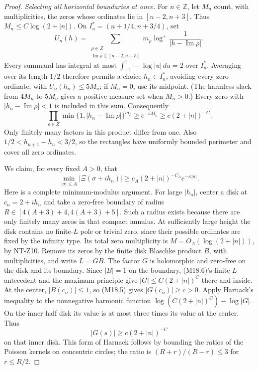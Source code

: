 \begin{proof}
\emph{Selecting all horizontal boundaries at once.}
For \(n\in\mathbb Z\), let \(M_n\) count, with multiplicities,
the zeros whose ordinates lie in \([n-2,n+3]\).  Thus
\(M_n\le C\log(2+|n|)\).  On
\(I_n^*=(n+1/4,n+3/4)\), set
\[
 U_n(h)=\sum_{\substack{\rho\in Z\\
                    \operatorname{Im}\rho\in[n-2,n+3]}}
       m_\rho\log^+\frac1{|h-\operatorname{Im}\rho|}.
\]
Every summand has integral at most
\(\int_{-1}^1-\log|u|\,du=2\) over \(I_n^*\).
Averaging over its length \(1/2\) therefore permits a
choice \(h_n\in I_n^*\), avoiding every zero ordinate,
with \(U_n(h_n)\le 5M_n\); if \(M_n=0\), use its midpoint.
(The harmless slack from \(4M_n\) to \(5M_n\) gives a
positive-measure set when \(M_n>0\).)
Every zero with \(|h_n-\operatorname{Im}\rho|<1\)
is included in this sum.  Consequently
\[
 \prod_{\rho\in Z}
   \min\{1,|h_n-\operatorname{Im}\rho|\}^{m_\rho}
      \ge e^{-5M_n}\ge c(2+|n|)^{-C}.                            \tag{M18.7}
\]
Only finitely many factors in this product differ from one.
Also \(1/2<h_{n+1}-h_n<3/2\), so the rectangles have
uniformly bounded perimeter and cover all zero ordinates.

We claim, for every fixed \(A>0\), that
\[
 \min_{|\sigma|\le A}|\Xi(\sigma+i h_n)|
       \ge c_A(2+|n|)^{-C_A}e^{-\kappa|n|}.                      \tag{M18.8}
\]
Here is a complete minimum-modulus argument.  For large
\(|h_n|\), center a disk at \(c_n=2+i h_n\) and take a
zero-free boundary of radius
\(R\in[4(A+3)+4,4(A+3)+5]\).  Such a radius exists because
there are only finitely many zeros in that compact annulus.
At sufficiently large height the disk contains no finite-\(L\)
pole or trivial zero, since their possible ordinates are fixed
by the infinity type.  Its total zero multiplicity is
\(M=O_A(\log(2+|n|))\), by NT-Z10.  Remove its zeros by the
finite disk Blaschke product \(B\), with multiplicities,
and write \(L=GB\).  The factor \(G\) is holomorphic and
zero-free on the disk and its boundary.  Since \(|B|=1\)
on the boundary, (M18.6)'s finite-\(L\) antecedent and the
maximum principle give \(|G|\le C(2+|n|)^C\) there and
inside.  At the center, \(|B(c_n)|\le1\), so (M18.5)
gives \(|G(c_n)|\ge c>0\).
Apply Harnack's inequality to the nonnegative harmonic
function \(\log(C(2+|n|)^C)-\log|G|\).  On the inner
half disk its value is at most three times its value
at the center.  Thus
\[
                        |G(s)|\ge c(2+|n|)^{-C}
\]
on that inner disk.  This form of Harnack follows by
bounding the ratios of the Poisson kernels on concentric
circles; the ratio is \((R+r)/(R-r)\le3\) for \(r\le R/2\).


\end{proof}
